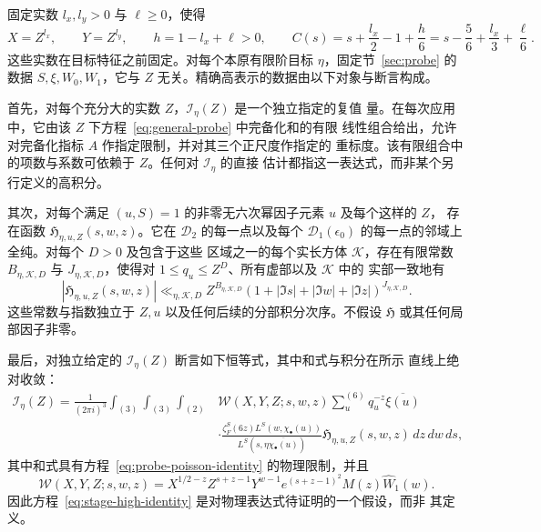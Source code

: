 \begin{definition}[精确高表示的数据]
\label{def:stage-high-data}
固定实数 $l_x,l_y>0$ 与 $\ell\ge0$，使得
\begin{equation}
 X=Z^{l_x},\qquad Y=Z^{l_y},\qquad h=1-l_x+\ell>0,
 \qquad
 C(s)=s+\frac{l_x}{2}-1+\frac h6
     =s-\frac56+\frac{l_x}{3}+\frac\ell6.
 \label{eq:stage-mellin-exponent}
\end{equation}
这些实数在目标特征之前固定。对每个本原有限阶目标 $\eta$，固定节~\ref{sec:probe} 的
数据 $S,\xi,W_0,W_1$，它与 $Z$ 无关。精确高表示的数据由以下对象与断言构成。

首先，对每个充分大的实数 $Z$，$\mathscr I_\eta(Z)$ 是一个独立指定的复值
量。在每次应用中，它由该 $Z$ 下方程~\eqref{eq:general-probe} 中完备化和的有限
线性组合给出，允许对完备化指标 $A$ 作指定限制，并对其三个正尺度作指定的
重标度。该有限组合中的项数与系数可依赖于 $Z$。任何对 $\mathscr I_\eta$ 的直接
估计都指这一表达式，而非某个另行定义的高积分。

其次，对每个满足 $(u,S)=1$ 的非零无六次幂因子元素 $u$ 及每个这样的 $Z$，
存在函数 $\mathfrak H_{\eta,u,Z}(s,w,z)$。它在 $\mathcal D_2$ 的每一点以及每个
$\mathcal D_1(\epsilon_0)$ 的每一点的邻域上全纯。对每个 $D>0$ 及包含于这些
区域之一的每个实长方体 $\mathcal K$，存在有限常数 $B_{\eta,\mathcal K,D}$ 与
$J_{\eta,\mathcal K,D}$，使得对 $1\le q_u\le Z^D$、所有虚部以及 $\mathcal K$ 中的
实部一致地有
\begin{equation}
 |\mathfrak H_{\eta,u,Z}(s,w,z)|
 \ll_{\eta,\mathcal K,D}
 Z^{B_{\eta,\mathcal K,D}}
 (1+|\Im s|+|\Im w|+|\Im z|)^{J_{\eta,\mathcal K,D}}.
 \label{eq:stage-all-height-majorant}
\end{equation}
这些常数与指数独立于 $Z,u$ 以及任何后续的分部积分次序。不假设 $\mathfrak H$
或其任何局部因子非零。

最后，对独立给定的 $\mathscr I_\eta(Z)$ 断言如下恒等式，其中和式与积分在所示
直线上绝对收敛：
\begin{equation}
\begin{split}
 \mathscr I_\eta(Z)=\frac1{(2\pi i)^3}
 \int_{(3)}\int_{(3)}\int_{(2)}
 &\mathcal W(X,Y,Z;s,w,z)
 \sum_u^{(6)}q_u^{-z}\overline{\xi(u)}\\
 &\cdot
 \frac{\zeta_F^S(6z)L^S(w,\chi_\bullet(u))}
      {L^S(s,\eta\overline{\chi_\bullet(u)})}
 \mathfrak H_{\eta,u,Z}(s,w,z)\,dz\,dw\,ds,
\end{split}
\label{eq:stage-high-identity}
\end{equation}
其中和式具有方程~\eqref{eq:probe-poisson-identity} 的物理限制，并且
\[
 \mathcal W(X,Y,Z;s,w,z)
 =X^{1/2-z}Z^{s+z-1}Y^{w-1}
       e^{(s+z-1)^2}M(z)\widehat W_1(w).
\]
因此方程~\eqref{eq:stage-high-identity} 是对物理表达式待证明的一个假设，而非
其定义。
\end{definition}

